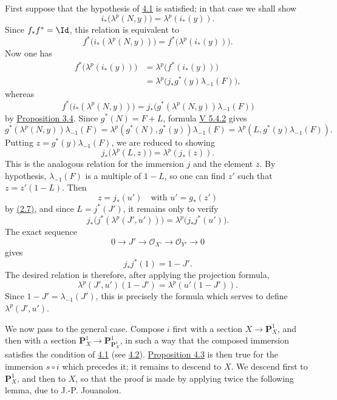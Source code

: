 First suppose that the hypothesis of \hyperlink{sga6.e07.lem.4-1}{4.1} is satisfied; in that case we shall show
\[
  i_*\bigl(\lambda^p(N,y)\bigr)=\lambda^p(i_*(y)).
\]
Since \(f_*f^*=\Id\), this relation is equivalent to
\[
  f^*\bigl(i_*(\lambda^p(N,y))\bigr)=
  f^*\bigl(\lambda^p(i_*(y))\bigr).
\]
Now one has
\[
\begin{aligned}
 f^*\bigl(\lambda^p(i_*(y))\bigr)
 &=\lambda^p\bigl(f^*(i_*(y))\bigr)\\
 &=\lambda^p\bigl(j_*g^*(y)\lambda_{-1}(F)\bigr),
\end{aligned}
\tag{3.4}
\]
whereas
\[
  f^*\bigl(i_*(\lambda^p(N,y))\bigr)
  =
  j_*\bigl(g^*(\lambda^p(N,y))\lambda_{-1}(F)\bigr)
  \tag{3.4}
\]
by \hyperlink{sga6.e07.prop.3-4}{Proposition 3.4}. Since \(g^*(N)=F+L\), formula \hyperlink{sga6.e05.eq.5-4-2}{V 5.4.2} gives
\[
  g^*(\lambda^p(N,y))\lambda_{-1}(F)
  =
  \lambda^p(g^*(N),g^*(y))\lambda_{-1}(F)
  =
  \lambda^p(L,g^*(y)\lambda_{-1}(F)).
\]
Putting \(z=g^*(y)\lambda_{-1}(F)\), we are reduced to showing
\[
  j_*\bigl(\lambda^p(L,z)\bigr)=\lambda^p(j_*(z)).
\]
This is the analogous relation for the immersion \(j\) and the element \(z\). By hypothesis, \(\lambda_{-1}(F)\) is a multiple of \(1-L\), so one can find \(z'\) such that \(z=z'(1-L)\). Then
\[
  z=j_*(u')\quad\text{with }u'=g_*(z')
\]
by \hyperlink{sga6.e07.para.2-6}{(2.7)}, and since \(L=j^*(J')\), it remains only to verify
\[
  j_*\bigl(j^*(\lambda^p(J',u'))\bigr)=
  \lambda^p\bigl(j_*j^*(u')\bigr).
\]
The exact sequence
\[
  0\longrightarrow J'\longrightarrow \mathcal O_{X'}
  \longrightarrow \mathcal O_{Y'}\longrightarrow 0
\]
gives
\begin{equation}\tag{4.3.2}
  j_*j^*(1)=1-J'.
\end{equation}
The desired relation is therefore, after applying the projection formula,
\[
  \lambda^p(J',u')(1-J')=\lambda^p(u'(1-J')).
\]
Since \(1-J'=\lambda_{-1}(J')\), this is precisely the formula which serves to define \(\lambda^p(J',u')\).

We now pass to the general case. Compose \(i\) first with a section \(X\to\mathbf P_X^1\), and then with a section \(\mathbf P_X^1\to\mathbf P_{\mathbf P_X^1}^1\), in such a way that the composed immersion satisfies the condition of \hyperlink{sga6.e07.lem.4-1}{4.1} (see \hyperlink{sga6.e07.sec.4.2}{4.2}). \hyperlink{sga6.e07.thm.4-3}{Proposition 4.3} is then true for the immersion \(s\circ i\) which precedes it; it remains to descend to \(X\). We descend first to \(\mathbf P_X^1\), and then to \(X\), so that the proof is made by applying twice the following lemma, due to J.-P. Jouanolou.

